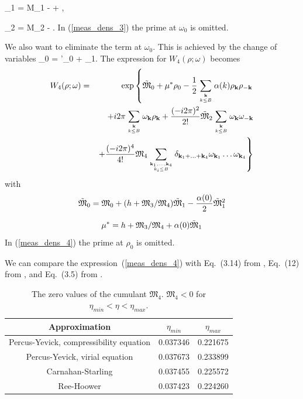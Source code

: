 \be
{}_1 = \frak M_1 - + ,
\ee

\be
{}_2 = \frak M_2 - .
\ee
In (\ref{meas_dens_3}) the prime at $\omega_0$ is omitted.

We also want to eliminate the term at $\omega_0$. This is achieved by the change of variables
\be
\rho_0 = \rho'_0 + _1.
\ee
The expression for $W_4(\rho; \omega)$ becomes
\begin{eqnarray}
	\label{meas_dens_4}
	W_4(\rho;\omega) &=& \exp \left\{\tilde{\frak M}_0 + \mu^*\rho_0
	- \frac12  \sum\limits_{{\vb k}\atop k\le B} \alpha(k) \rho_{\vb k} \rho_{-{\vb k}} \right.  \nonumber\\
	&&
	+ i2\pi \sum\limits_{{\vb k} \atop k\le B} \omega_{\vb k} \rho_{\vb k}
	+ \frac{(-i2\pi)^2}{2!}\tilde{\frak M}_2 \sum\limits_{{\vb k} \atop k\le B} \omega_{\vb k} \omega_{-\vb k}
	\nonumber\\
	&& \left. +
	\frac{(-i2\pi)^4}{4!} 
	{\frak M}_4
	\sum\limits_{\vb{k}_1,\dotsc,\vb{k}_4\atop{k_i \le B}}
	\delta_{\vb{k}_1 + \dotsc + \vb{k}_4} 
	\omega_{{\vb k}_1} \dots \omega_{{\vb k}_4} \right\}
\end{eqnarray}
with
\begin{equation}
\label{tilde_frak_M0}
\tilde{\frak M}_0 = \frak M_0 + (h + {\frak M_3}/{\frak M_4})\tilde{\frak M}_1 - \frac{\alpha(0)}{2}\tilde{\frak M}_1^2
\end{equation}

\begin{equation}
	\label{mu_star}
	\mu^* = h + {\frak M_3}/{\frak M_4} + \alpha(0)\tilde{\frak M}_1
\end{equation}
In (\ref{meas_dens_4}) the prime at $\rho_0$ is omitted.

We can compare the expression~(\ref{meas_dens_4}) with Eq.~(3.14) from \cite{Yukh1990}, Eq.~(12) from \cite{YukhJSP1995}, and Eq.~(3.5) from \cite{Yukh2013}.

\begin{table}[h]
	\caption{The zero values of the cumulant $\mathfrak{M_4}$. $\mathfrak{M_4} < 0$ for $\eta_{min} < \eta < \eta_{max}$.}
	\label{tab:cum_m4_zeros}
	\begin{center}
		\begin{tabular}{|c|c|c|}
			\hline
			Approximation & $\eta_{min}$ & $\eta_{max}$ \\
			\hline
			Percus-Yevick, compressibility equation \quad & 0.037346 \quad & 0.221675 \quad \\
			Percus-Yevick, virial equation          & 0.037673 & 0.233899 \\
			Carnahan-Starling                       & 0.037455 & 0.225572 \\
			Ree-Hoower                              & 0.037423 & 0.224260 \\
			\hline
		\end{tabular}
	\end{center}
\end{table}

